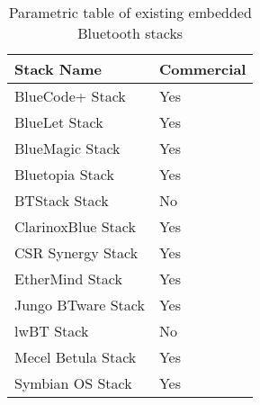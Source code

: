 \begin{table}[h]
	\begin{center}
		\begin{tabular}{ | l | l |}
			\hline
			\textbf{Stack Name}	& \textbf{Commercial} \\ \hline

			BlueCode+ Stack		& Yes	\\ \hline
			BlueLet Stack		& Yes	\\ \hline
			BlueMagic Stack		& Yes	\\ \hline
			Bluetopia Stack		& Yes	\\ \hline
			BTStack Stack		& No	\\ \hline
			ClarinoxBlue Stack	& Yes	\\ \hline
			CSR Synergy Stack	& Yes	\\ \hline
			EtherMind Stack		& Yes	\\ \hline
			Jungo BTware Stack	& Yes	\\ \hline
			lwBT Stack			& No	\\ \hline
			Mecel Betula Stack	& Yes	\\ \hline
			Symbian OS Stack	& Yes	\\ \hline
			\hline
		\end{tabular}
		\caption[Existing Embedded Bluetooth Stacks]{Parametric table of existing embedded Bluetooth stacks}
		\label{tab:embbtstacks}
	\end{center}
\end{table}


